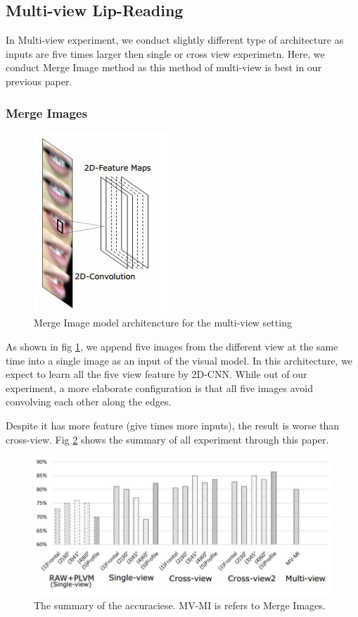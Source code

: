 \subsection{Multi-view Lip-Reading}
In Multi-view experiment, we conduct slightly different type of architecture as inputs are five times larger then single or cross view experimetn. Here, we conduct Merge Image method as this method of multi-view is best in our previous paper.

\subsubsection*{Merge Images}
\begin{figure}[h]
	\centering
	\includegraphics[width=0.4\columnwidth]{fig/mi.jpg}
	\caption{Merge Image model architencture for the multi-view setting}
	\label{fig:mi}
\end{figure}
As shown in fig \ref{fig:mi}, we append five images from the different
view at the same time into a single image as an input of the visual model. In this
architecture, we expect to learn all the five view feature by 2D-CNN. While out
of our experiment, a more elaborate configuration is that all five images avoid
convolving each other along the edges.

Despite it has more feature (give times more inputs), the result is worse than cross-view.
Fig \ref{fig:summary} shows the summary of all experiment through this paper.
\begin{figure}[h]
	\centering
	\includegraphics[width=\columnwidth]{fig/summary.jpg}
	\caption{The summary of the accuraciese. MV-MI is refers to Merge Images.}
	\label{fig:summary}
\end{figure}

